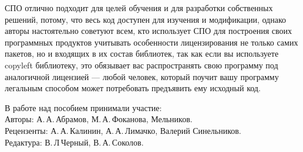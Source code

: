 СПО отлично подходит для целей обучения и для разработки собственных решений, потому, что весь 
код доступен для изучения и модификации, однако авторы настоятельно советуют всем, кто использует 
СПО для построения своих программных продуктов учитывать особенности лицензирования не только самих 
пакетов, но и входящих в их состав библиотек, так как если вы используете copyleft библиотеку, 
это обязывает вас распространять свою программу под аналогичной лицензией --- любой человек, который 
поучит вашу программу легальным способом может потребовать предъявить ему исходный код.

В работе над пособием принимали участие:\\ 
Авторы: А.\,А.\,Абрамов, М.\,А.\,Фоканова, Мельников.\\ 
Рецензенты: А.\,А.\,Калинин, А.\,А.\,Лимачко, Валерий Синельников. \\
Редактура: В.\,Л\,Черный, В.\,А.\,Соколов.

